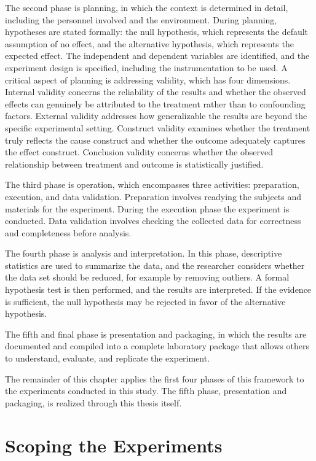 \documentclass[
english,                 %
bibtex,                  %
includeExtraAbstracts, %
]{kththesis}
\numberwithin{listing}{chapter}
\begin{document}
The second phase is planning, in which the context is determined in detail, including the personnel involved and the environment. During planning, hypotheses are stated formally: the null hypothesis, which represents the default assumption of no effect, and the alternative hypothesis, which represents the expected effect. The independent and dependent variables are identified, and the experiment design is specified, including the instrumentation to be used. A critical aspect of planning is addressing validity, which has four dimensions. Internal validity concerns the reliability of the results and whether the observed effects can genuinely be attributed to the treatment rather than to confounding factors. External validity addresses how generalizable the results are beyond the specific experimental setting. Construct validity examines whether the treatment truly reflects the cause construct and whether the outcome adequately captures the effect construct. Conclusion validity concerns whether the observed relationship between treatment and outcome is statistically justified.

The third phase is operation, which encompasses three activities: preparation, execution, and data validation. Preparation involves readying the subjects and materials for the experiment. During the execution phase the experiment is conducted. Data validation involves checking the collected data for correctness and completeness before analysis.

The fourth phase is analysis and interpretation. In this phase, descriptive statistics are used to summarize the data, and the researcher considers whether the data set should be reduced, for example by removing outliers. A formal hypothesis test is then performed, and the results are interpreted. If the evidence is sufficient, the null hypothesis may be rejected in favor of the alternative hypothesis.

The fifth and final phase is presentation and packaging, in which the results are documented and compiled into a complete laboratory package that allows others to understand, evaluate, and replicate the experiment.

The remainder of this chapter applies the first four phases of this framework to the experiments conducted in this study. The fifth phase, presentation and packaging, is realized through this thesis itself.

\section{Scoping the Experiments}
\end{document}
